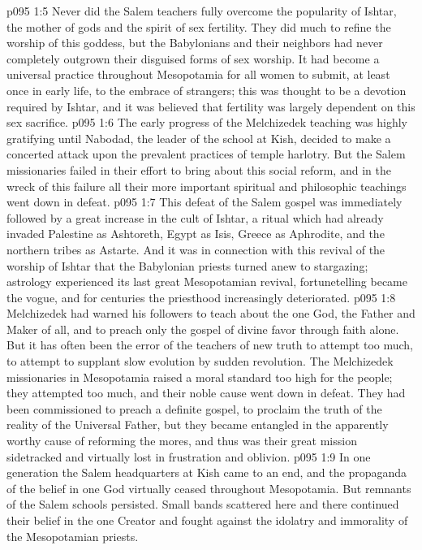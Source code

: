 \vs p095 1:5 Never did the Salem teachers fully overcome the popularity of Ishtar, the mother of gods and the spirit of sex fertility. They did much to refine the worship of this goddess, but the Babylonians and their neighbors had never completely outgrown their disguised forms of sex worship. It had become a universal practice throughout Mesopotamia for all women to submit, at least once in early life, to the embrace of strangers; this was thought to be a devotion required by Ishtar, and it was believed that fertility was largely dependent on this sex sacrifice.
\vs p095 1:6 \pc The early progress of the Melchizedek teaching was highly gratifying until Nabodad, the leader of the school at Kish, decided to make a concerted attack upon the prevalent practices of temple harlotry. But the Salem missionaries failed in their effort to bring about this social reform, and in the wreck of this failure all their more important spiritual and philosophic teachings went down in defeat.
\vs p095 1:7 This defeat of the Salem gospel was immediately followed by a great increase in the cult of Ishtar, a ritual which had already invaded Palestine as Ashtoreth, Egypt as Isis, Greece as Aphrodite, and the northern tribes as Astarte. And it was in connection with this revival of the worship of Ishtar that the Babylonian priests turned anew to stargazing; astrology experienced its last great Mesopotamian revival, fortunetelling became the vogue, and for centuries the priesthood increasingly deteriorated.
\vs p095 1:8 Melchizedek had warned his followers to teach about the one God, the Father and Maker of all, and to preach only the gospel of divine favor through faith alone. But it has often been the error of the teachers of new truth to attempt too much, to attempt to supplant slow evolution by sudden revolution. The Melchizedek missionaries in Mesopotamia raised a moral standard too high for the people; they attempted too much, and their noble cause went down in defeat. They had been commissioned to preach a definite gospel, to proclaim the truth of the reality of the Universal Father, but they became entangled in the apparently worthy cause of reforming the mores, and thus was their great mission sidetracked and virtually lost in frustration and oblivion.
\vs p095 1:9 In one generation the Salem headquarters at Kish came to an end, and the propaganda of the belief in one God virtually ceased throughout Mesopotamia. But remnants of the Salem schools persisted. Small bands scattered here and there continued their belief in the one Creator and fought against the idolatry and immorality of the Mesopotamian priests.

